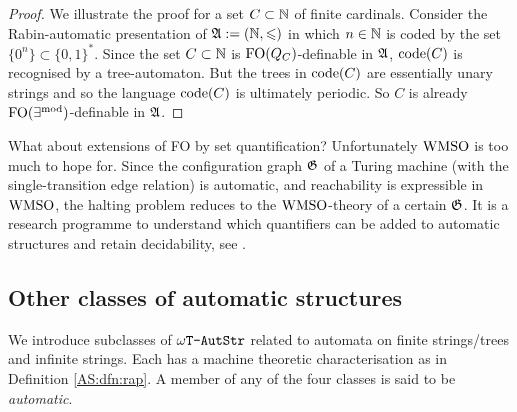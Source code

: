 \begin{proof} 
We illustrate the proof for a set $C \subset \mathbb{N}$ of finite cardinals.
Consider the Rabin-automatic presentation of  $\mathfrak{A} := (\mathbb{N},\leqslant)$ in which $n \in \mathbb{N}$ is coded
by the set $\{0^n\} \subset \{0,1\}^\ast$. Since the set $C \subset \mathbb{N}$  is $\mbox{\rm FO}(Q_C)$-definable in $\mathfrak{A}$, ${\rm code}({C})$ 
is recognised by a tree-automaton. But the trees in ${\rm code}({C})$ are essentially unary strings and so the language ${\rm code}({C})$ is ultimately periodic. So $C$ is already $\mbox{\rm FO}(\exists^{\text{mod}})$-definable in $\mathfrak{A}$. 
\end{proof}

What about extensions of FO by set quantification?  Unfortunately $\mbox{\rm WMSO}$ is
too much to hope for.  Since the configuration graph $\mathfrak{G}$ of a Turing machine (with the
single-transition edge relation) is automatic, and reachability
is expressible in $\mbox{\rm WMSO}$, the halting problem reduces to the $\mbox{\rm WMSO}$-theory of a certain $\mathfrak{G}$. It is a research programme to understand which quantifiers can be added to automatic structures and retain decidability, see \cite{Rubi04,KuLo08JSL}. 


\subsection{Other classes of automatic structures}

We introduce subclasses of $\mbox{\tt $\omega$T-AutStr}$ related to automata on finite strings/trees and infinite strings. 
Each has a machine theoretic characterisation as in Definition \ref{AS:dfn:rap}.
A member of any of the four classes is said to be {\em automatic}. 

